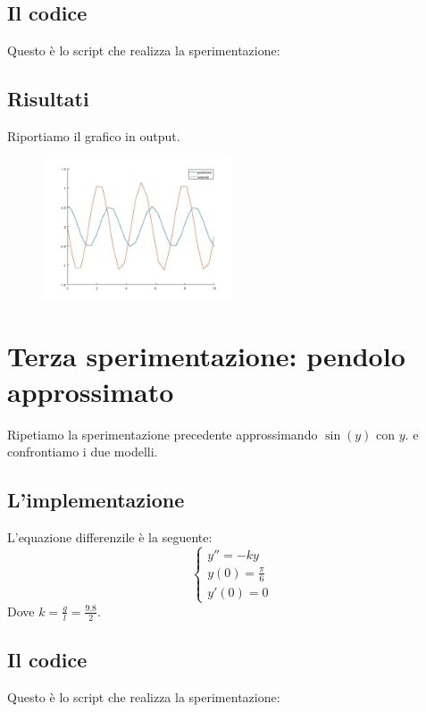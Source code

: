 \documentclass{article}
\begin{document}
	\subsection{Il codice}
	Questo è lo script che realizza la sperimentazione:
	
	
	\subsection{Risultati}
	Riportiamo il grafico in output.\\
	\begin{figure}[htp!]
		\centering 
		\includegraphics[width=0.5\textwidth]{5_2.jpeg}
	\end{figure}
	
	\section{Terza sperimentazione: pendolo approssimato}
	Ripetiamo la sperimentazione precedente approssimando $\sin(y)$ con $y$. e confrontiamo i due modelli.
	\subsection{L'implementazione}
	L'equazione differenzile è la seguente:
	\begin{equation}
	\begin{cases}
	y''=-k y \\
	y(0)=\frac{\pi}{6}\\
	y'(0)=0
	\end{cases}
	\end{equation}
	Dove $k=\frac{g}{l}=\frac{9.8}{2}$.
	
	\subsection{Il codice}
	Questo è lo script che realizza la sperimentazione:
	
	
\end{document}

